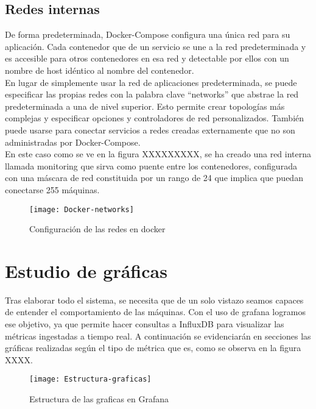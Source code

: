 \documentclass[ spanish, a4paper, 12pt, oneside]{report}
\begin{document}
\subsection{Redes internas}
De forma predeterminada, Docker-Compose configura una única red para su aplicación. Cada contenedor que de un servicio se une a la red predeterminada y es accesible para otros contenedores en esa red y detectable por ellos con un nombre de host idéntico al nombre del contenedor.\\

En lugar de simplemente usar la red de aplicaciones predeterminada, se puede especificar las propias redes con la palabra clave ``networks'' que abstrae la red predeterminada a una de nivel superior. Esto permite crear topologías más complejas y especificar opciones y controladores de red personalizados. 
También puede usarse para conectar servicios a redes creadas externamente que no son administradas por Docker-Compose. \\

En este caso como se ve en la figura XXXXXXXXX, se ha creado una red interna llamada monitoring que sirva como puente entre los contenedores, configurada con una máscara de red constituida por un rango de 24 que implica que puedan conectarse 255 máquinas.\\

\begin{figure}[!h]
   \centering
   \texttt{[image: Docker-networks]}\\
      \caption{\label{fig: Configuración de las redes en docker} Configuración de las redes en docker}
\end{figure}

\section{Estudio de gráficas}

Tras elaborar todo el sistema, se necesita que de un solo vistazo seamos capaces de entender el comportamiento de las máquinas. Con el uso de grafana logramos ese objetivo, ya que permite hacer consultas a InfluxDB para visualizar las métricas ingestadas a tiempo real. A continuación se evidenciarán en secciones 
las gráficas realizadas según el tipo de métrica que es, como se observa en la figura XXXX. \\ 

\begin{figure}[!h]
   \centering
   \texttt{[image: Estructura-graficas]}\\
      \caption{\label{fig: Estructura de las graficas en Grafana} Estructura de las graficas en Grafana}
\end{figure}
\end{document}
